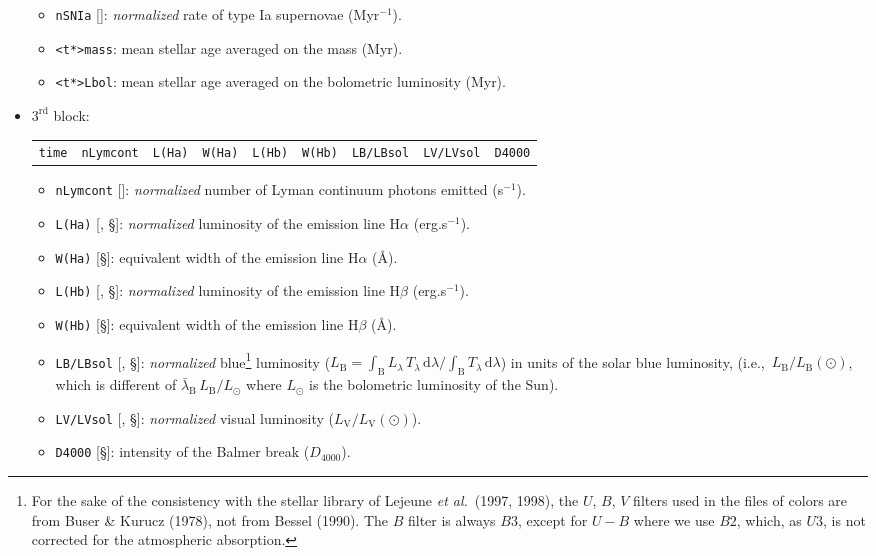 \documentclass[11pt,draft,fleqn]{article}
\begin{document}
\begin{itemize}
\begin{itemize}
\item \texttt{nSNIa} [\dag]: \emph{normalized} rate of type Ia supernovae (Myr$^{-1}$).
\item \texttt{<t*>mass}: mean stellar age averaged on the mass (Myr).
\item \texttt{<t*>Lbol}: mean stellar age averaged on the bolometric 
luminosity (Myr).
\end{itemize}
\item $3^{\mathrm{rd}}$ block:
\begin{tabular}{@{}ccccccccc}
\texttt{time} & \texttt{nLymcont} &   \texttt{L(Ha)} &    \texttt{W(Ha)} &    \texttt{L(Hb)} &    \texttt{W(Hb)} &  \texttt{LB/LBsol} & \texttt{LV/LVsol} &   \texttt{D4000} 
\end{tabular}
\begin{itemize}
\item \texttt{nLymcont} [\dag]: \emph{normalized} number of Lyman continuum
photons emitted (s$^{-1}$).
\item \texttt{L(Ha)} [\dag, \S]: \emph{normalized} luminosity of the emission line H$\alpha$ (erg.s$^{-1}$).
\item \texttt{W(Ha)} [\S]: equivalent width of the emission line
H$\alpha$ (\AA).
\item \texttt{L(Hb)} [\dag, \S]: \emph{normalized} luminosity of the 
emission line H$\beta$ (erg.s$^{-1}$).
\item \texttt{W(Hb)} [\S]: equivalent width of the emission line
H$\beta$ (\AA).
\item \texttt{LB/LBsol} [\dag, \S]: \emph{normalized} 
blue\footnote{For the sake 
of the consistency with the stellar library of Lejeune 
\emph{et al.}\ (1997, 1998), the $U$, $B$, $V$
filters used in the files of colors are from Buser \& Kurucz (1978), not from Bessel (1990).
The $B$ filter is always $B3$, except for $U-B$ where
we use $B2$, which, as $U3$, is not corrected for the atmospheric absorption.\label{UBV}}
luminosity ($L_{\mathrm{B}}=\int_{\mathrm{B}} L_{\lambda}\,T_{\lambda}\,\mathrm{d}\lambda/\int_{\mathrm{B}} T_{\lambda}\,\mathrm{d}\lambda$)
in units of the solar blue luminosity,
(i.e.,\ $L_{\mathrm{B}}/L_{\mathrm{B}}(\odot)$, which is different 
of $\bar{\lambda}_{\mathrm{B}}\,L_{\mathrm{B}}/L_{\odot}$ where
$L_{\odot}$ is the bolometric luminosity of the Sun).
\item \texttt{LV/LVsol} [\dag, \S]: \emph{normalized} visual luminosity 
($L_{\mathrm{V}}/L_{\mathrm{V}}(\odot)$).
\item \texttt{D4000} [\S]: intensity of the Balmer break ($D_{4000}$).

\end{itemize}
\end{itemize}
\end{document}
